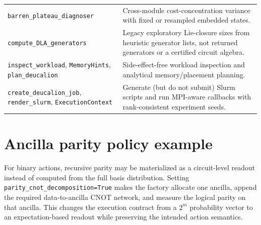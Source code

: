 \documentclass[10pt]{article}
\newcommand{\code}[1]{\texttt{#1}}
\begin{document}
\begin{table}[H]
\begin{tabularx}{\textwidth}{@{}p{}X@{}}
\code{barren\_plateau\_diagnoser} & Cross-module cost-concentration variance with fixed or resampled embedded states. \\
\code{compute\_DLA\_generators} & Legacy exploratory Lie-closure sizes from heuristic generator lists, not returned generators or a certified circuit algebra. \\
\code{inspect\_workload}, \code{MemoryHints}, \code{plan\_deucalion} & Side-effect-free workload inspection and analytical memory/placement planning. \\
\code{create\_deucalion\_job}, \code{render\_slurm}, \code{ExecutionContext} & Generate (but do not submit) Slurm scripts and run MPI-aware callbacks with rank-consistent experiment seeds. \\
\bottomrule
\end{tabularx}
\end{table}

\section{Ancilla parity policy example}
\label{app:ancilla-parity}

For binary actions, recursive parity may be materialized as a circuit-level readout instead of computed from the full basis distribution.  Setting \code{parity\_cnot\_decomposition=True} makes the factory allocate one ancilla, append the required data-to-ancilla CNOT network, and measure the logical parity on that ancilla.  This changes the execution contract from a $2^m$ probability vector to an expectation-based readout while preserving the intended action semantics.
\end{document}
